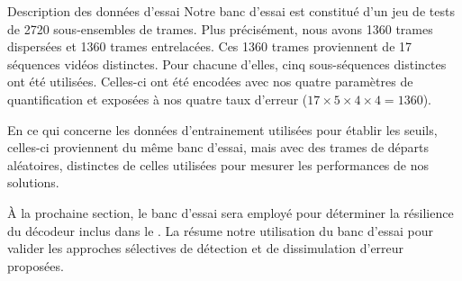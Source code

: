 \begin{section}{Description des données d'essai}
Notre banc d'essai est constitué d'un jeu de tests de 2720 sous-ensembles de
trames. Plus précisément, nous avons 1360 trames dispersées et 1360 trames
entrelacées. Ces 1360 trames proviennent de 17 séquences vidéos distinctes. Pour
chacune d'elles, cinq sous-séquences distinctes ont été utilisées. Celles-ci ont
été encodées avec nos quatre paramètres de quantification et exposées à nos
quatre taux d'erreur ($17 \times 5 \times 4 \times 4 = 1360$).

En ce qui concerne les données d'entrainement utilisées pour établir les
seuils, celles-ci proviennent du même banc d'essai, mais avec des trames de
départs aléatoires, distinctes de celles utilisées pour mesurer les performances
de nos solutions.

À la prochaine section, le banc d'essai sera employé pour déterminer la
résilience du décodeur inclus dans le \ltCodec. La
 résume notre utilisation du banc d'essai pour
valider les approches sélectives de détection et de dissimulation d'erreur
proposées.

\FloatBarrier
\end{section}


